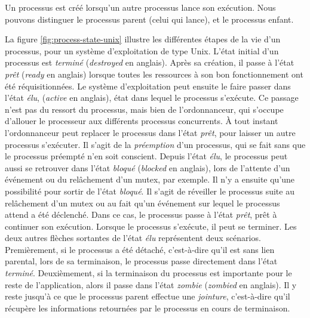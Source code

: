 Un processus est créé lorsqu'un autre processus lance son exécution. Nous pouvons distinguer le processus parent (celui qui lance), et le processus enfant.

La figure \ref{fig:process-state-unix} illustre les différentes étapes de la vie d'un processus, pour un système d'exploitation de type Unix. L'état initial d'un processus est \emph{terminé} (\emph{destroyed} en anglais). Après sa création, il passe à l'état \emph{prêt} (\emph{ready} en anglais) lorsque toutes les ressources à son bon fonctionnement ont été réquisitionnées.
Le système d'exploitation peut ensuite le faire passer dans l'état \emph{élu}, (\emph{active} en anglais), état dans lequel le processus s'exécute.
Ce passage n'est pas du ressort du processus, mais bien de l'ordonnanceur, qui s'occupe d'allouer le processeur aux différents processus concurrents. À tout instant l'ordonnanceur peut replacer le processus dans l'état \emph{prêt}, pour laisser un autre processus s'exécuter. Il s'agit de la \emph{préemption} d'un processus, qui se fait sans que le processus préempté n'en soit conscient. Depuis l'état \emph{élu}, le processus peut aussi se retrouver dans l'état \emph{bloqué} (\emph{blocked} en anglais), lors de l'attente d'un événement ou du relâchement d'un mutex, par exemple. Il n'y a ensuite qu'une possibilité pour sortir de l'état \emph{bloqué}. Il s'agit de réveiller le processus suite au relâchement d'un mutex ou au fait qu'un événement sur lequel le processus attend a été déclenché. Dans ce cas, le processus passe à l'état \emph{prêt}, prêt à continuer son exécution. Lorsque le processus s'exécute, il peut se terminer. Les deux autres flèches sortantes de l'état \emph{élu} représentent deux scénarios. Premièrement, si le processus a été détaché, c'est-à-dire qu'il est sans lien parental, lors de sa terminaison, le processus passe directement dans l'état \emph{terminé}. Deuxièmement, si la terminaison du processus est importante pour le reste de l'application, alors il passe dans l'état \emph{zombie} (\emph{zombied} en anglais). Il y reste jusqu'à ce que le processus parent effectue une \emph{jointure}, c'est-à-dire qu'il récupère les informations retournées par le processus en cours de terminaison.

